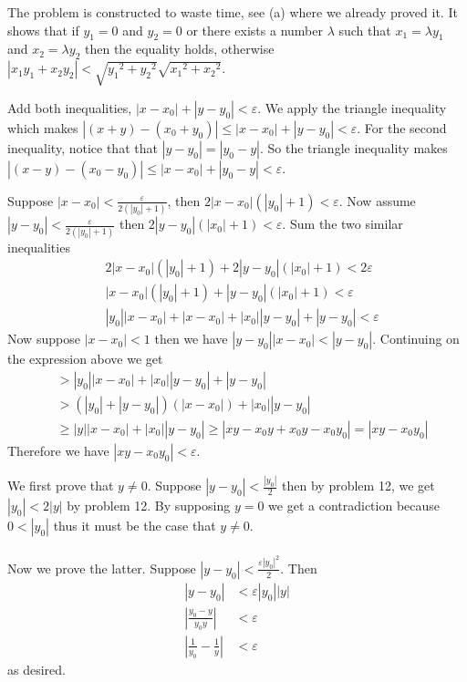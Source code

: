 \begin{problem}
{	\item The problem is constructed to waste time, see (a) where we already proved it. It shows that if $y_1=0$ and $y_2=0$ or there exists a number $\lambda$ such that $x_1=\lambda y_1$ and $x_2=\lambda y_2$ then the equality holds, otherwise $|x_1y_1+x_2y_2| < \sqrt{{y_1}^2+{y_2}^2}\sqrt{{x_1}^2+{x_2}^2}$.
	}

	
\end{problem}

\begin{problem}
	Add both inequalities, $|x-x_0|+|y-y_0| < \varepsilon$. We apply the triangle inequality which makes $|(x+y)-(x_0+y_0)|\leq |x-x_0|+|y-y_0|<\varepsilon$. For the second inequality, notice that that  $|y-y_0|=|y_0-y|$. So the triangle inequality makes $|(x-y)-(x_0-y_0)|\leq |x-x_0|+|y_0-y| < \varepsilon$.
\end{problem}

\begin{hproblem}
	Suppose $|x-x_0|< \frac{\varepsilon}{2(|y_0|+1)}$, then $2|x-x_0|(|y_0|+1) < \varepsilon$. Now assume $|y-y_0|< \frac{\varepsilon}{2(|y_0|+1)}$ then $2|y-y_0|(|x_0|+1) < \varepsilon$. Sum the two similar inequalities \\
	\begin{align*}
		&2|x-x_0|(|y_0|+1)+2|y-y_0|(|x_0|+1) < 2\varepsilon \\
		&|x-x_0|(|y_0|+1)+|y-y_0|(|x_0|+1) < \varepsilon \\
	&|y_0||x-x_0|+|x-x_0|+|x_0||y-y_0|+|y-y_0| < \varepsilon
	\end{align*}
	Now suppose $|x-x_0| < 1$ then we have $|y-y_0||x-x_0| < |y-y_0|$.
	Continuing on the expression above we get
	\begin{align*}
		&>|y_0||x-x_0|+|x_0||y-y_0|+|y-y_0| \\
	&>(|y_0|+|y-y_0|)(|x-x_0|)+|x_0||y-y_0| \\
	&\geq |y||x-x_0|+|x_0||y-y_0| \geq |xy-x_0y+x_0y-x_0y_0| = |xy-x_0y_0|
	\end{align*}
	Therefore we have $|xy-x_0y_0| < \varepsilon$. 
\end{hproblem}

\begin{hproblem}
	We first prove that $y\neq 0$. Suppose $|y-y_0|<\frac{|y_0|}{2}$ then by problem 12, we get $|y_0| < 2|y|$ by problem 12. By supposing $y=0$ we get a contradiction because $0<|y_0|$ thus it must be the case that $y\neq 0$. \\\\
	Now we prove the latter. Suppose $|y-y_0| < \frac{\varepsilon|y_0|^2}{2}$. Then 
	\begin{align*}
		|y-y_0| &< \varepsilon|y_0||y| \\
		\left| \frac{y_0-y}{y_0y} \right| &< \varepsilon \\
		\left| \frac{1}{y_0}-\frac{1}{y} \right| &< \varepsilon
	\end{align*}
	as desired.
\end{hproblem}

